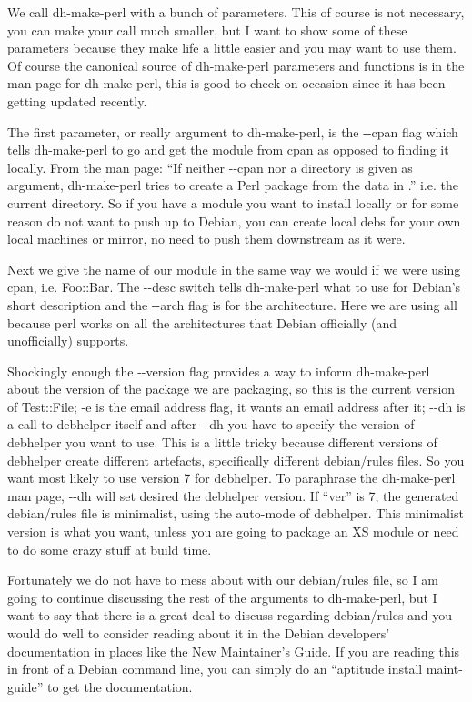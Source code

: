 We call dh-make-perl with a bunch of parameters.  This of course is not
necessary, you can make your call much smaller, but I want to show some of these
parameters because they make life a little easier and you may want to use them.
Of course the canonical source of dh-make-perl parameters and functions is in
the man page for dh-make-perl, this is good to check on occasion since it has
been getting updated recently\cite{debs_cpan-git_dh_make_perl}.

The f\hbox{}irst parameter, or really argument to dh-make-perl, is the {-}{-}cpan f\hbox{}lag
which tells dh-make-perl to go and get the module from cpan as opposed to
f\hbox{}inding it locally. From the man page: ``If neither {-}{-}cpan nor a directory
is given as argument, dh-make-perl tries to create a Perl package from the data
in .'' i.e. the current directory.  So if you have a module you want to install
locally or for some reason do not want to push up to Debian, you can create
local debs for your own local machines or mirror, no need to push them
downstream as it were.

Next we give the name of our module in the same way we would if we were using
cpan, i.e. Foo::Bar. The {-}{-}desc switch tells dh-make-perl what to use for
Debian's short description and the {-}{-}arch f\hbox{}lag is for the architecture. Here
we are using all because perl works on all the architectures that Debian
of\hbox{}f\hbox{}icially (and unof\hbox{}f\hbox{}icially) supports. 

Shockingly enough the {-}{-}version f\hbox{}lag provides a way to inform dh-make-perl
about the version of the package we are packaging, so this is the  current
version of Test::F\hbox{}ile; -e is the email address f\hbox{}lag, it wants an email address
after it; {-}{-}dh is a call to debhelper itself and after {-}{-}dh you have to
specify the version of debhelper you want to use. This is a little tricky
because dif\hbox{}ferent versions of debhelper create dif\hbox{}ferent artefacts, specif\hbox{}ically
dif\hbox{}ferent debian/rules f\hbox{}iles. So you want most likely to use version 7 for
debhelper. To paraphrase the dh-make-perl man page, {-}{-}dh will set desired
the debhelper version. If ``ver'' is 7, the generated debian/rules f\hbox{}ile is
minimalist, using the auto-mode of debhelper. This minimalist version is what
you want, unless you are going to package an XS module or need to do some crazy
stuf\hbox{}f at build time.

Fortunately we do not have to mess about with our debian/rules f\hbox{}ile, so I am
going to continue discussing the rest of the arguments to dh-make-perl, but I
want to say that there is a great deal to discuss regarding debian/rules and you
would do well to consider reading about it in the Debian developers'
documentation in places like the New Maintainer's
Guide\cite{debs_cpan-new_maint_guide-rules}. If you are reading this in front of
a Debian command line, you can simply do an ``aptitude install maint-guide'' to
get the documentation.


